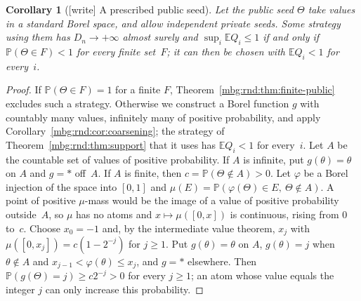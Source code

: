 \documentclass[11pt,letterpaper]{article}
\newtheorem{corollary}[theorem]{Corollary}
\theoremstyle{definition}
\newcommand{\E}{\mathbb E}
\newcommand{\Prb}{\mathbb P}
\begin{document}
\begin{corollary}[{[write]} A prescribed public seed]
\label{mbg:rnd:cor:prescribed}
Let the public seed $\Theta$ take values in a standard Borel space, and allow independent private seeds. Some strategy using them has $D_n\to+\infty$ almost surely and $\sup_i\E Q_i\le1$ if and only if $\Prb(\Theta\in F)<1$ for every finite set~$F$; it can then be chosen with $\E Q_i<1$ for every~$i$.
\end{corollary}
\begin{proof}
If $\Prb(\Theta\in F)=1$ for a finite $F$, Theorem~\ref{mbg:rnd:thm:finite-public} excludes such a strategy. Otherwise we construct a Borel function $g$ with countably many values, infinitely many of positive probability, and apply Corollary~\ref{mbg:rnd:cor:coarsening}; the strategy of Theorem~\ref{mbg:rnd:thm:support} that it uses has $\E Q_i<1$ for every~$i$. Let $A$ be the countable set of values of positive probability. If $A$ is infinite, put $g(\theta)=\theta$ on $A$ and $g=\ast$ off~$A$. If $A$ is finite, then $c=\Prb(\Theta\notin A)>0$. Let $\varphi$ be a Borel injection of the space into $[0,1]$ and $\mu(E)=\Prb(\varphi(\Theta)\in E,\ \Theta\notin A)$. A point of positive $\mu$-mass would be the image of a value of positive probability outside~$A$, so $\mu$ has no atoms and $x\mapsto\mu([0,x])$ is continuous, rising from $0$ to~$c$. Choose $x_0=-1$ and, by the intermediate value theorem, $x_j$ with $\mu([0,x_j])=c(1-2^{-j})$ for $j\ge1$. Put $g(\theta)=\theta$ on $A$, $g(\theta)=j$ when $\theta\notin A$ and $x_{j-1}<\varphi(\theta)\le x_j$, and $g=\ast$ elsewhere. Then $\Prb(g(\Theta)=j)\ge c2^{-j}>0$ for every $j\ge1$; an atom whose value equals the integer $j$ can only increase this probability.
\end{proof}
\end{document}
